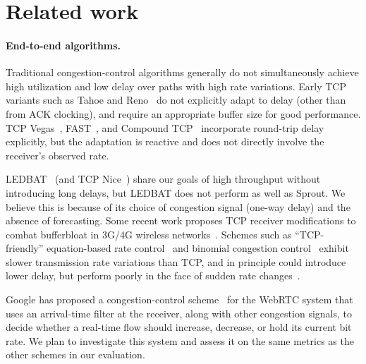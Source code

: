 \section{Related work}
\label{sprout:related}

\paragraph{End-to-end algorithms.}

Traditional congestion-control algorithms generally do not
simultaneously achieve high utilization and low delay over paths with
high rate variations.
Early TCP variants such as Tahoe and Reno~\cite{Jacobson88} do not
explicitly adapt to delay (other than from ACK clocking), and require
an appropriate buffer size for good performance. TCP
Vegas~\cite{vegas}, FAST~\cite{fasttcp}, and Compound TCP~\cite{compound}
incorporate round-trip delay explicitly, but the adaptation is
reactive and does not directly involve the receiver's observed rate.

LEDBAT~\cite{ledbat} (and TCP Nice~\cite{tcpnice}) share our goals of
high throughput without introducing long delays, but LEDBAT does not
perform as well as Sprout. We believe this is because of its choice of
congestion signal (one-way delay) and the absence of forecasting.
Some recent work proposes TCP receiver modifications to combat
bufferbloat in 3G/4G wireless networks~\cite{tcpbufferbloat}.
Schemes such as ``TCP-friendly'' equation-based
rate control~\cite{ebcc} and binomial congestion
control~\cite{binomial} exhibit slower transmission rate variations
than TCP, and in principle could introduce lower delay, but perform
poorly in the face of sudden rate changes~\cite{slowcc}.

Google has proposed a congestion-control scheme~\cite{WebRTCdraft} for
the WebRTC system that uses an arrival-time filter at the receiver,
along with other congestion signals, to decide whether a real-time
flow should increase, decrease, or hold its current bit rate. We plan
to investigate this system and assess it on the same metrics as the
other schemes in our evaluation.

